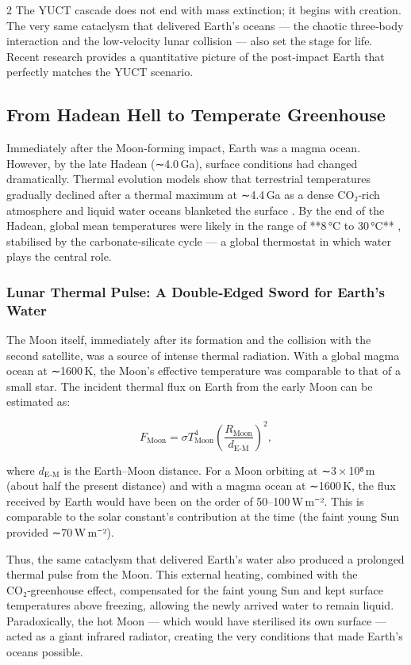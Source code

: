 \documentclass[11pt,a4paper]{article}
\begin{document}
\begin{multicols}{2}
		The YUCT cascade does not end with mass extinction; it begins with creation. 
		The very same cataclysm that delivered Earth’s oceans — the chaotic three‑body 
		interaction and the low‑velocity lunar collision — also set the stage for life. 
		Recent research provides a quantitative picture of the post‑impact Earth that 
		perfectly matches the YUCT scenario.
		
		\subsection{From Hadean Hell to Temperate Greenhouse}
		
		Immediately after the Moon‑forming impact, Earth was a magma ocean. However, 
		by the late Hadean (∼4.0 Ga), surface conditions had changed dramatically. 
		Thermal evolution models show that terrestrial temperatures gradually declined 
		after a thermal maximum at ∼4.4 Ga as a dense CO₂‑rich atmosphere and liquid 
		water oceans blanketed the surface \cite{Korenaga2017}. By the end of the Hadean, 
		global mean temperatures were likely in the range of **8 °C to 30 °C** 
		\cite{Charnay2017}, stabilised by the carbonate‑silicate cycle — a global 
		thermostat in which water plays the central role.
		
		\subsubsection{Lunar Thermal Pulse: A Double‑Edged Sword for Earth’s Water}
		
		The Moon itself, immediately after its formation and the collision with the 
		second satellite, was a source of intense thermal radiation. With a global 
		magma ocean at ∼1600 K, the Moon’s effective temperature was comparable to 
		that of a small star. The incident thermal flux on Earth from the early Moon 
		can be estimated as:
		
		\[
		F_{\text{Moon}} = \sigma T_{\text{Moon}}^{4} \left( \frac{R_{\text{Moon}}}{d_{\text{E-M}}} \right)^{2},
		\]
		
		where \(d_{\text{E-M}}\) is the Earth–Moon distance. For a Moon orbiting at 
		∼3 × 10⁸ m (about half the present distance) and with a magma ocean at 
		∼1600 K, the flux received by Earth would have been on the order of 
		50–100 W m⁻². This is comparable to the solar constant’s contribution at 
		the time (the faint young Sun provided ∼70 W m⁻²).
		
		Thus, the same cataclysm that delivered Earth’s water also produced a 
		prolonged thermal pulse from the Moon. This external heating, combined with 
		the CO₂‑greenhouse effect, compensated for the faint young Sun and kept 
		surface temperatures above freezing, allowing the newly arrived water to 
		remain liquid. Paradoxically, the hot Moon — which would have sterilised 
		its own surface — acted as a giant infrared radiator, creating the very 
		conditions that made Earth’s oceans possible.
		

\end{multicols}
\end{document}
